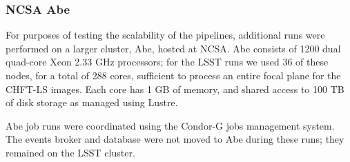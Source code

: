 \subsubsection{NCSA Abe}

For purposes of testing the scalability of the pipelines, additional runs were
performed on a larger cluster, Abe, hosted at NCSA. Abe consists of 1200
dual quad-core Xeon 2.33 GHz processors; for the LSST runs we used 36 of these 
nodes, for a total of 288 cores, sufficient to process an entire focal plane 
for the CHFT-LS images. Each core has 1 GB of memory, and shared access
to 100 TB of disk storage as managed using Lustre.

Abe job runs were coordinated using the Condor-G jobs management system.
The events broker and database were not moved to Abe during these runs;
they remained on the LSST cluster.
